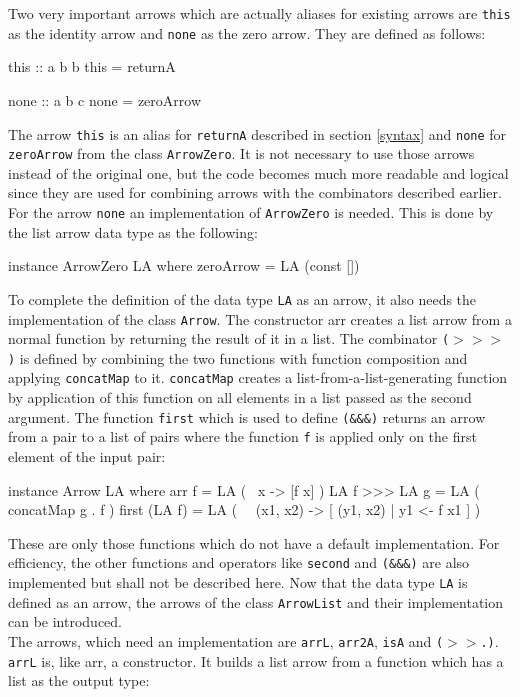 \documentclass[11pt,a4paper,headsepline, bibtotoc]{scrreprt}
\begin{document}
Two very important arrows which are actually aliases for existing arrows are \texttt{this} as the identity arrow and \texttt{none} as the zero arrow. They are defined as follows:
\begin{code}
this    :: a b b
this    = returnA

none    :: a b c
none    = zeroArrow
\end{code}
The arrow \texttt{this} is an alias for \texttt{returnA} described in section \ref{syntax} and \texttt{none} for \texttt{zeroArrow} from the class \texttt{ArrowZero}. It is not necessary to use those arrows instead of the original one, but the code becomes much more readable and logical since they are used for combining arrows with the combinators described earlier. For the arrow \texttt{none} an implementation of \texttt{ArrowZero} is needed. This is done by the list arrow data type as the following:
\begin{code}
instance ArrowZero LA where
  zeroArrow   = LA (const [])  
\end{code}
To complete the definition of the data type \texttt{LA} as an arrow, it also needs the implementation of the class \texttt{Arrow}. The constructor arr creates a list arrow from a normal function by returning the result of it in a list. The combinator {\tt ($>$$>$$>$)} is defined by combining the two functions with function composition and applying \texttt{concatMap} to it. \texttt{concatMap} creates a list-from-a-list-generating function by application of this function on all elements in a list passed as the second argument. The function \texttt{first} which is used to define {\tt (\&\&\&)} returns an arrow from a pair to a list of pairs where the function \texttt{f} is applied only on the first element of the input pair: 
\begin{code}
instance Arrow LA where
  arr f         = LA ( \ x -> [f x] )
  LA f >>> LA g	= LA ( concatMap g . f )
  first (LA f)  = LA ( \ ~(x1, x2) -> [ (y1, x2) | y1 <- f x1 ] )
\end{code}
These are only those functions which do not have a default implementation. For efficiency, the other functions and operators like \texttt{second} and {\tt (\&\&\&)} are also implemented but shall not be described here. Now that the data type \texttt{LA} is defined as an arrow, the arrows of the class \texttt{ArrowList} and their implementation can be introduced.\\
The arrows, which need an implementation are \texttt{arrL}, \texttt{arr2A}, \texttt{isA} and \texttt{($>$$>$.)}. \texttt{arrL} is, like arr, a constructor. It builds a list arrow from a function which has a list as the output type:
\end{document}
